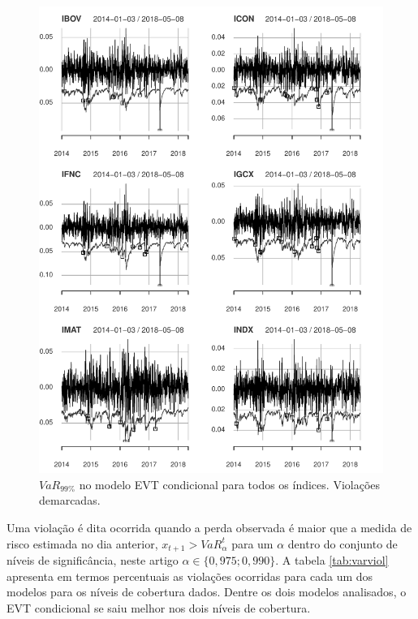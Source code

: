 \documentclass[1p]{elsarticle}
\theoremstyle{definition}
\begin{document}
\begin{figure}[H]
	\centering
	\includegraphics[width=1\linewidth]{figs/artigo-backtest}
	\caption{$VaR_{99\%}$ no modelo EVT condicional para todos os índices. Violações demarcadas.}
	\label{fig:artigo-backtest}
\end{figure}

Uma violação é dita ocorrida quando a perda observada é maior que a medida de risco estimada no dia anterior, $x_{t+1}>VaR^t_\alpha$ para um $\alpha$ dentro do conjunto de níveis de significância, neste artigo $\alpha \in \{0,975; 0,990\}$. A tabela \ref{tab:varviol} apresenta em termos percentuais as violações ocorridas para cada um dos modelos para os níveis de cobertura dados. Dentre os dois modelos analisados, o EVT condicional se saiu melhor nos dois níveis de cobertura.
\end{document}
